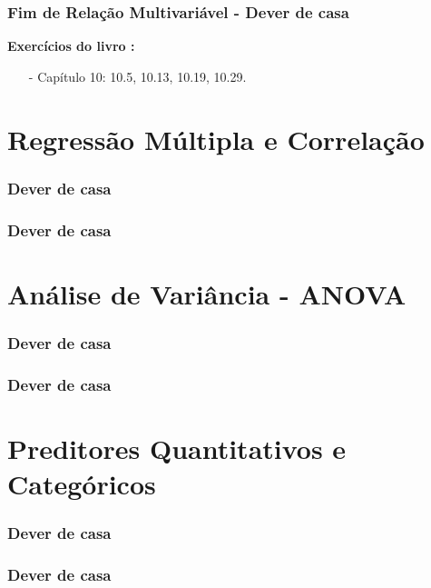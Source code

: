 \documentclass[graphics,14pt]{beamer}
\begin{document}
\begin{frame}[t,fragile=singleslide]
\frametitle{Fim de Relação Multivariável - Dever de casa}
\textbf{Exercícios do livro \cite{Agresti2018}:}
\begin{itemize}
	\item[-] Capítulo 10: 10.5, 10.13, 10.19, 10.29.
\end{itemize}

\end{frame}
\section{Regressão Múltipla e Correlação}
\begin{frame}[t,fragile=singleslide]
\frametitle{Dever de casa}
\end{frame}
\begin{frame}[t,fragile=singleslide]
\frametitle{Dever de casa}
\end{frame}
\section{Análise de Variância - ANOVA}
\begin{frame}[t,fragile=singleslide]
\frametitle{Dever de casa}
\end{frame}
\begin{frame}[t,fragile=singleslide]
\frametitle{Dever de casa}
\end{frame}
\section{Preditores Quantitativos e Categóricos}
\begin{frame}[t,fragile=singleslide]
\frametitle{Dever de casa}
\end{frame}
\begin{frame}[t,fragile=singleslide]
\frametitle{Dever de casa}
\end{frame}
\end{document}
